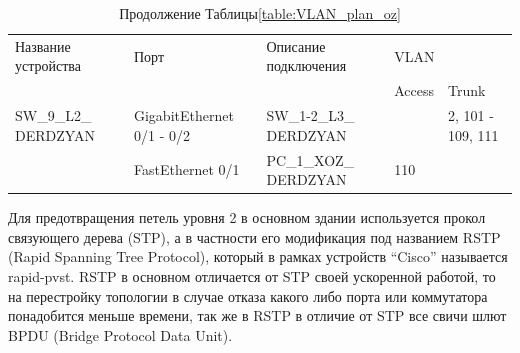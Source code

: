 \begin{table}[H]
    \centering
	\caption{Продолжение Таблицы\;\ref{table:VLAN_plan_oz}}
    \small
	\begin{tabularx}{\textwidth}{|X|X|X|X|X|}
        \hline
		Название устройства	&	Порт	& Описание подключения 	& \multicolumn{2}{X|}{VLAN} \\
		\cline{4-5}
							&			&						&	Access	&	Trunk \\
		\hline   
		SW\_9\_L2\_ DERDZYAN & GigabitEthernet 0/1 - 0/2 & SW\_1-2\_L3\_ DERDZYAN  & 		&2, 101 - 109, 111\\
		\cline{2-5}
			& FastEthernet 0/1 & PC\_1\_XOZ\_ DERDZYAN &	110	&\\
		\hline
    \end{tabularx}
\end{table}


Для предотвращения петель уровня 2 в основном здании используется прокол связующего дерева\cite{stp-for-small} (STP), а в частности его модификация под названием RSTP (Rapid Spanning Tree Protocol), который в рамках устройств ``Cisco'' называется rapid-pvst. RSTP в основном отличается от STP своей ускоренной работой, то на перестройку топологии в случае отказа какого либо порта или коммутатора понадобится меньше времени, так же в RSTP в отличие от STP все свичи шлют BPDU (Bridge Protocol Data Unit).

